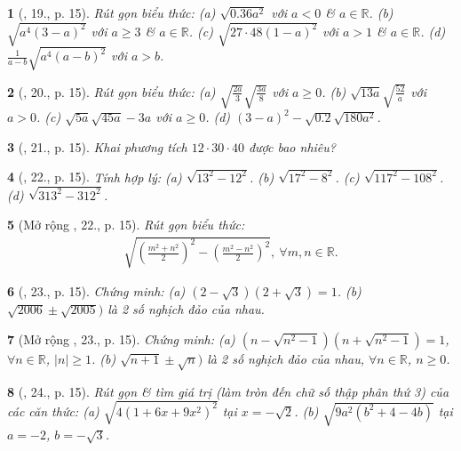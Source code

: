 \documentclass{article}
\newtheorem{baitoan}{}
\begin{document}
\begin{baitoan}[\cite{SGK_Toan_9_tap_1}, 19., p. 15]
	Rút gọn biểu thức: (a) $\sqrt{0.36a^2}$ với $a < 0$ \& $a\in\mathbb{R}$. (b) $\sqrt{a^4(3 - a)^2}$ với $a\ge3$ \& $a\in\mathbb{R}$. (c) $\sqrt{27\cdot48(1 - a)^2}$ với $a > 1$ \& $a\in\mathbb{R}$. (d) $\frac{1}{a - b}\sqrt{a^4(a - b)^2}$ với $a > b$.
\end{baitoan}

\begin{baitoan}[\cite{SGK_Toan_9_tap_1}, 20., p. 15]
	Rút gọn biểu thức: (a) $\sqrt{\frac{2a}{3}}\sqrt{\frac{3a}{8}}$ với $a\ge0$. (b) $\sqrt{13a}\sqrt{\frac{52}{a}}$ với $a > 0$. (c) $\sqrt{5a}\sqrt{45a} - 3a$ với $a\ge0$. (d) $(3 - a)^2 - \sqrt{0.2}\sqrt{180a^2}$.
\end{baitoan}

\begin{baitoan}[\cite{SGK_Toan_9_tap_1}, 21., p. 15]
	Khai phương tích $12\cdot30\cdot40$ được bao nhiêu?
\end{baitoan}

\begin{baitoan}[\cite{SGK_Toan_9_tap_1}, 22., p. 15]
	Tính hợp lý: (a) $\sqrt{13^2 - 12^2}$. (b) $\sqrt{17^2 - 8^2}$. (c) $\sqrt{117^2 - 108^2}$. (d) $\sqrt{313^2 - 312^2}$.
\end{baitoan}

\begin{baitoan}[Mở rộng \cite{SGK_Toan_9_tap_1}, 22., p. 15]
	Rút gọn biểu thức:
	\begin{align*}
		\sqrt{\left(\frac{m^2 + n^2}{2}\right)^2 - \left(\frac{m^2 - n^2}{2}\right)^2},\ \forall m,n\in\mathbb{R}.
	\end{align*}
\end{baitoan}

\begin{baitoan}[\cite{SGK_Toan_9_tap_1}, 23., p. 15]
	Chứng minh: (a) $(2 - \sqrt{3})(2 + \sqrt{3}) = 1$. (b) $\sqrt{2006}\pm\sqrt{2005})$ là 2 số nghịch đảo của nhau.
\end{baitoan}

\begin{baitoan}[Mở rộng \cite{SGK_Toan_9_tap_1}, 23., p. 15]
	Chứng minh: (a) $(n - \sqrt{n^2 - 1})(n + \sqrt{n^2 - 1}) = 1$, $\forall n\in\mathbb{R}$, $|n|\ge1$. (b) $\sqrt{n + 1}\pm\sqrt{n})$ là 2 số nghịch đảo của nhau, $\forall n\in\mathbb{R}$, $n\ge0$.
\end{baitoan}

\begin{baitoan}[\cite{SGK_Toan_9_tap_1}, 24., p. 15]
	Rút gọn \& tìm giá trị (làm tròn đến chữ số thập phân thứ 3) của các căn thức: (a) $\sqrt{4(1 + 6x + 9x^2)^2}$ tại $x = -\sqrt{2}$. (b) $\sqrt{9a^2(b^2 + 4 - 4b)}$ tại $a = -2$, $b = -\sqrt{3}$. 
\end{baitoan}
\end{document}
